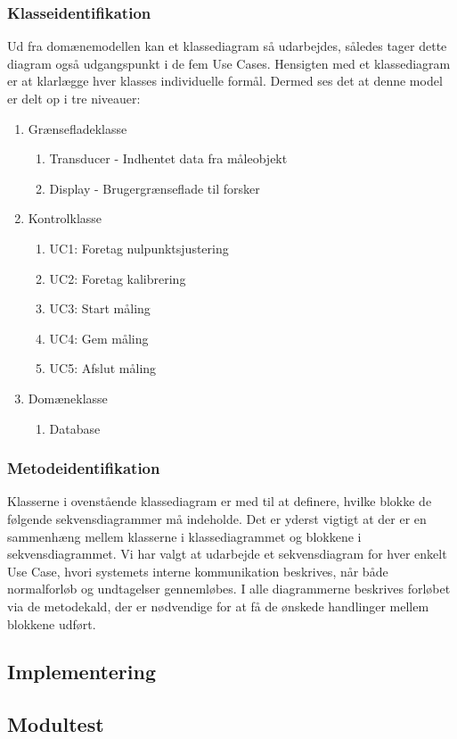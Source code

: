 \subsubsection{Klasseidentifikation}
Ud fra domænemodellen kan et klassediagram så udarbejdes, således tager dette diagram også udgangspunkt i de fem Use Cases. Hensigten med et klassediagram er at klarlægge hver klasses individuelle formål. Dermed ses det at denne model er delt op i tre niveauer:
\begin{enumerate}
\item Grænsefladeklasse
\begin{enumerate}
\item Transducer - Indhentet data fra måleobjekt
\item Display - Brugergrænseflade til forsker
\end{enumerate}
\item Kontrolklasse
\begin{enumerate}
\item UC1: Foretag nulpunktsjustering
\item UC2: Foretag kalibrering
\item UC3: Start måling
\item UC4: Gem måling
\item UC5: Afslut måling
\end{enumerate}
\item Domæneklasse
\begin{enumerate}
\item Database
\end{enumerate}
\end{enumerate}

\subsubsection{Metodeidentifikation}
Klasserne i ovenstående klassediagram er med til at definere, hvilke blokke de følgende sekvensdiagrammer må indeholde. Det er yderst vigtigt at der er en sammenhæng mellem klasserne i klassediagrammet og blokkene i sekvensdiagrammet. Vi har valgt at udarbejde et sekvensdiagram for hver enkelt Use Case, hvori systemets interne kommunikation beskrives, når både normalforløb og undtagelser gennemløbes. I alle diagrammerne beskrives forløbet via de metodekald, der er nødvendige for at få de ønskede handlinger mellem blokkene udført. 

\subsection{Implementering}
\subsection{Modultest}
